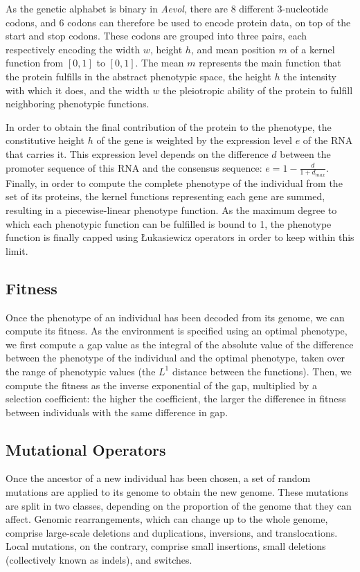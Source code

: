 As the genetic alphabet is binary in \emph{Aevol}, there are 8 different 3-nucleotide codons, and 6 codons can therefore be used to encode protein data, on top of the start and stop codons.
These codons are grouped into three pairs, each respectively encoding the width $w$, height $h$, and mean position $m$ of a kernel function from $[0, 1]$ to $[0, 1]$.
The mean $m$ represents the main function that the protein fulfills in the abstract phenotypic space, the height $h$ the intensity with which it does, and the width $w$ the pleiotropic ability of the protein to fulfill neighboring phenotypic functions.

In order to obtain the final contribution of the protein to the phenotype, the constitutive height $h$ of the gene is weighted by the expression level $e$ of the RNA that carries it.
This expression level depends on the difference $d$ between the promoter sequence of this RNA and the consensus sequence: $e = 1 - \frac{d}{1+d_{max}}$.
Finally, in order to compute the complete phenotype of the individual from the set of its proteins, the kernel functions representing each gene are summed, resulting in a piecewise-linear phenotype function.
As the maximum degree to which each phenotypic function can be fulfilled is bound to 1, the phenotype function is finally capped using Łukasiewicz operators in order to keep within this limit.

\subsection{Fitness}

Once the phenotype of an individual has been decoded from its genome, we can compute its fitness.
As the environment is specified using an optimal phenotype, we first compute a gap value as the integral of the absolute value of the difference between the phenotype of the individual and the optimal phenotype, taken over the range of phenotypic values (the $L^1$ distance between the functions).
Then, we compute the fitness as the inverse exponential of the gap, multiplied by a selection coefficient: the higher the coefficient, the larger the difference in fitness between individuals with the same difference in gap.

\subsection{Mutational Operators}

Once the ancestor of a new individual has been chosen, a set of random mutations are applied to its genome to obtain the new genome.
These mutations are split in two classes, depending on the proportion of the genome that they can affect.
Genomic rearrangements, which can change up to the whole genome, comprise large-scale deletions and duplications, inversions, and translocations.
Local mutations, on the contrary, comprise small insertions, small  deletions (collectively known as indels), and switches.

